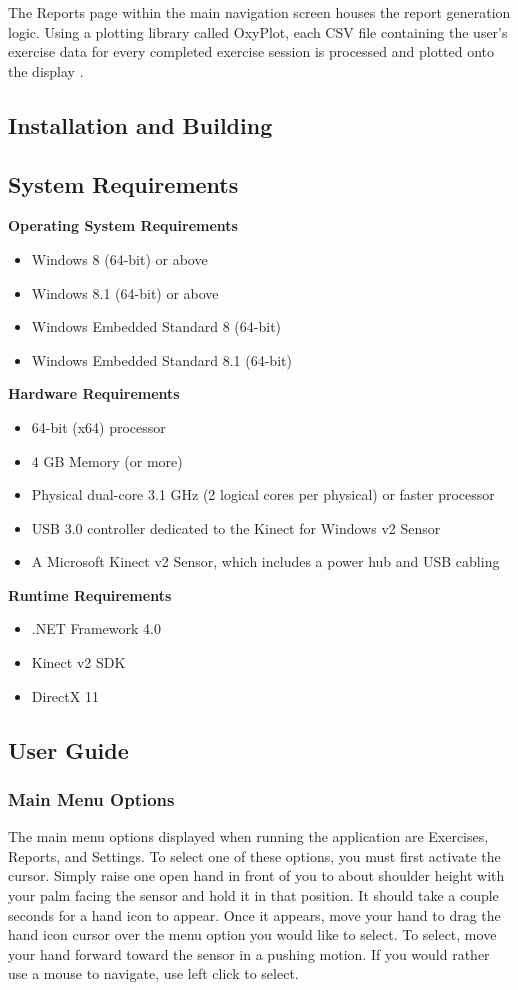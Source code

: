 \documentclass[onecolumn, draftclsnofoot,10pt, compsoc]{IEEEtran}
\begin{document}
The Reports page within the main navigation screen houses the report generation logic. Using a plotting library called OxyPlot, each CSV file containing the user's exercise data for every completed exercise session is processed and plotted onto the display \cite{Vitruvius, KinectDevelop, csvFile}.

\subsection{Installation and Building}

\subsection{System Requirements}
\textbf{Operating System Requirements}
\begin{itemize}
    \item Windows 8 (64-bit) or above
    \item Windows 8.1 (64-bit) or above
    \item Windows Embedded Standard 8 (64-bit)
    \item Windows Embedded Standard 8.1 (64-bit) \cite{KinectConstraints}
\end{itemize}
\textbf{Hardware Requirements}
\begin{itemize}
    \item 64-bit (x64) processor
    \item 4 GB Memory (or more)
    \item Physical dual-core 3.1  GHz (2 logical cores per physical) or faster processor
    \item USB 3.0 controller dedicated to the Kinect for Windows v2 Sensor
    \item A Microsoft Kinect v2 Sensor, which includes a power hub and USB cabling \cite{KinectDevelop,KinectConstraints}
\end{itemize}
\textbf{Runtime Requirements}
\begin{itemize}
    \item .NET Framework 4.0
    \item Kinect v2 SDK
    \item DirectX 11
\end{itemize}
\subsection{User Guide}
\subsubsection{Main Menu Options}
The main menu options displayed when running the application are Exercises, Reports, and Settings. To select one of these options, you must first activate the cursor. Simply raise one open hand in front of you to about shoulder height with your palm facing the sensor and hold it in that position. It should take a couple seconds for a hand icon to appear. Once it appears, move your hand to drag the hand icon cursor over the menu option you would like to select. To select, move your hand forward toward the sensor in a pushing motion. If you would rather use a mouse to navigate, use left click to select.
\end{document}
